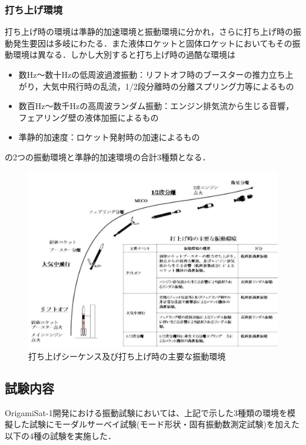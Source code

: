 \subsubsection{打ち上げ環境}
打ち上げ時の環境は準静的加速環境と振動環境に分かれ，さらに打ち上げ時の振動発生要因は多岐にわたる．また液体ロケットと固体ロケットにおいてもその振動環境は異なる．しかし大別すると打ち上げ時の過酷な環境は
\begin{itemize}
	\item 数Hz～数十Hzの低周波過渡振動：リフトオフ時のブースターの推力立ち上がり，大気中飛行時の乱流，1/2段分離時の分離スプリング力等によるもの
	\item 数百Hz～数千Hzの高周波ランダム振動：エンジン排気流から生じる音響，フェアリング壁の液体加振によるもの
	\item 準静的加速度：ロケット発射時の加速によるもの
\end{itemize}
の2つの振動環境と準静的加速環境の合計3種類となる．\par
\begin{figure}[H]
	\centering
	\includegraphics[width=1\linewidth]{04/fig/4-3-1.pdf}
	\caption{打ち上げシーケンス及び打ち上げ時の主要な振動環境\cite{vibration_test_handbook}}
	\label{fig4-3-1}
\end{figure}

\subsection{試験内容}
OrigamiSat-1開発における振動試験においては、上記で示した3種類の環境を模擬した試験にモーダルサーベイ試験(モード形状・固有振動数測定試験)を加えた以下の4種の試験を実施した．

